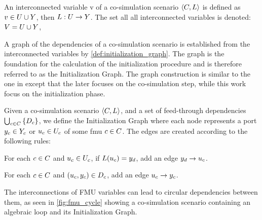\begin{definition}
An interconnected variable v of a co-simulation scenario $ \left\langle C, L \right\rangle $ is defined as $v \in U \cup Y$, then $L : U \to Y$.
The set all all interconnected variables is denoted: $V = U \cup Y$,
\end{definition}

A graph of the dependencies of a co-simulation scenario is established from the interconnected variables by \cref{def:initialization_graph}. The graph is the foundation for the calculation of the initialization procedure and is therefore referred to as the Initialization Graph. The graph construction is similar to the one in \cite{Gomes2019c} except that the later focuses on the co-simulation step, while this work focus on the initialization phase.

\begin{definition}\label{def:initialization_graph}
  Given a co-simulation scenario $ \left\langle C, L \right\rangle $, and a set of feed-through dependencies $\bigcup_{c \in C}  \left\{ D_{c} \right\}$, we define the Initialization Graph where each node represents a port $y_{c} \in Y_{c}$ or $u_{c} \in U_{c}$ of some fmu $c \in C$. The edges are created according to the following rules:
  \begin{compactenum}
    \item For each $c \in C$ and $u_{c} \in U_{c}$, if $L(u_{c}) = y_{d}$, add an edge $y_{d} -> u_{c}$.
    \item For each $c \in C$ and $(u_{c},y_{c}) \in D_{c}$, add an edge $u_{c} -> y_{c}$.
  \end{compactenum}
\end{definition}

The interconnections of FMU variables can lead to circular dependencies between them, as seen in \cref{fig:fmu_cycle} showing a co-simulation scenario containing an algebraic loop and its Initialization Graph.

